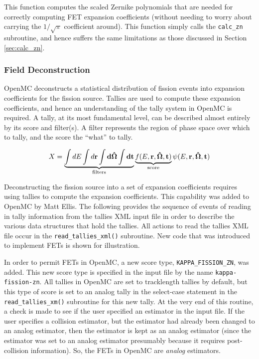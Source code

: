 \documentclass[10pt]{article}
\newcommand{\beq}{\begin{equation}}
\newcommand{\eeq}{\end{equation}}
\newcounter{subsubsubsection}[subsubsection]
\numberwithin{equation}{section} %
\begin{document}
This function computes the scaled Zernike polynomials that are needed for correctly computing FET expansion coefficients (without needing to worry about carrying the \(1/\sqrt{\pi}\) coefficient around). This function simply calls the {\tt calc\_zn} subroutine, and hence suffers the same limitations as those discussed in Section \ref{sec:calc_zn}. 

\subsubsection{Field Deconstruction}
OpenMC deconstructs a statistical distribution of fission events into expansion coefficients for the fission source. Tallies are used to compute these expansion coefficients, and hence an understanding of the tally system in OpenMC is required. A tally, at its most fundamental level, can be described almost entirely by its score and filter(s). A filter represents the region of phase space over which to tally, and the score the ``what'' to tally. 

\beq
X=\underbrace{\int dE\int d\bf{r}\int d\hat{\Omega}\int dt}_{\textrm{filters}} \underbrace{f(E,\bf{r},\hat{\Omega},t)}_{\textrm{score}}\psi(E,\bf{r},\hat{\Omega},t)
\eeq

Deconstructing the fission source into a set of expansion coefficients requires using tallies to compute the expansion coefficients. This capability was added to OpenMC by Matt Ellis. The following provides the sequence of events of reading in tally information from the tallies XML input file in order to describe the various data structures that hold the tallies. All actions to read the tallies XML file occur in the {\tt read\_tallies\_xml()} subroutine. New code that was introduced to implement FETs is shown for illustration.

In order to permit FETs in OpenMC, a new score type, {\tt KAPPA\_FISSION\_ZN}, was added. This new score type is specified in the input file by the name {\tt kappa-fission-zn}. All tallies in OpenMC are set to tracklength tallies by default, but this type of score is set to an analog tally in the select-case statement in the {\tt read\_tallies\_xm()} subroutine for this new tally. At the very end of this routine, a check is made to see if the user specified an estimator in the input file. If the user specifies a collision estimator, but the estimator had already been changed to an analog estimator, then the estimator is kept as an analog estimator (since the estimator was set to an analog estimator presumably because it requires post-collision information). So, the FETs in OpenMC are {\it analog} estimators.
\end{document}
